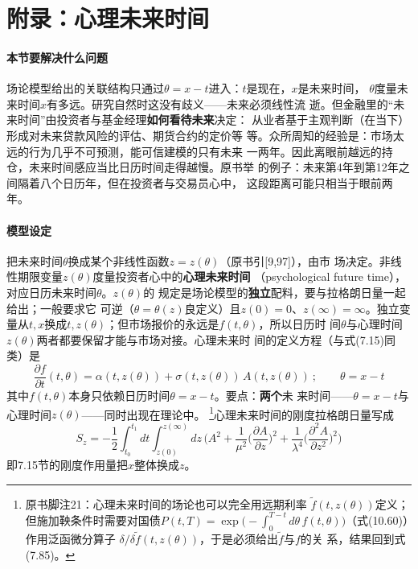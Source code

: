 \section{附录：心理未来时间}

\paragraph{本节要解决什么问题}
场论模型给出的关联结构只通过$\theta=x-t$进入：$t$是现在，$x$是未来时间，
$\theta$度量未来时间$x$有多远。研究自然时这没有歧义——未来必须线性流
逝。但金融里的“未来时间”由投资者与基金经理\textbf{如何看待未来}决定：
从业者基于主观判断（在当下）形成对未来贷款风险的评估、期货合约的定价等
等。众所周知的经验是：市场太远的行为几乎不可预测，能可信建模的只有未来
一两年。因此离眼前越远的持仓，未来时间感应当比日历时间走得越慢。原书举
的例子：未来第4年到第12年之间隔着八个日历年，但在投资者与交易员心中，
这段距离可能只相当于眼前两年。

\paragraph{模型设定}
把未来时间$\theta$换成某个非线性函数$z=z(\theta)$（原书引[9,97]），由市
场决定。非线性期限变量$z(\theta)$度量投资者心中的\textbf{心理未来时间}
（psychological future time），对应日历未来时间$\theta$。$z(\theta)$的
规定是场论模型的\textbf{独立}配料，要与拉格朗日量一起给出；一般要求它
可逆（$\theta=\theta(z)$良定义）且$z(0)=0$、$z(\infty)=\infty$。独立变
量从$t,x$换成$t,z(\theta)$；但市场报价的永远是$f(t,\theta)$，所以日历时
间$\theta$与心理时间$z(\theta)$两者都要保留才能与市场对接。心理未来时
间的定义方程（与式(7.15)同类）是
\begin{equation*}
\frac{\partial f}{\partial t}(t,\theta)=\alpha(t,z(\theta))
+\sigma(t,z(\theta))\,A(t,z(\theta))\ ;\qquad \theta=x-t
\tag{7.85}
\end{equation*}
其中$f(t,\theta)$本身只依赖日历时间$\theta=x-t$。要点：\textbf{两个}未
来时间——$\theta=x-t$与心理时间$z(\theta)$——同时出现在理论中。
\footnote{原书脚注21：心理未来时间的场论也可以完全用远期利率
$\tilde{f}(t,z(\theta))$定义；但施加鞅条件时需要对国债$P(t,T)=
\exp\bigl(-\int_{0}^{T-t}d\theta\,f(t,\theta)\bigr)$（式(10.60)）作用泛函微分算子
$\delta/\delta\tilde{f}(t,z(\theta))$，于是必须给出$\tilde{f}$与$f$的关
系，结果回到式(7.85)。}心理未来时间的刚度拉格朗日量写成
\begin{equation*}
S_{z}=-\frac{1}{2}\int_{t_{0}}^{t_{1}}dt\int_{z(0)}^{z(\infty)}dz\,
\Biggl(A^{2}+\frac{1}{\mu^{2}}\biggl(\frac{\partial A}{\partial z}
\biggr)^{2}+\frac{1}{\lambda^{4}}\biggl(\frac{\partial^{2}A}{\partial z^{2}}
\biggr)^{2}\Biggr)
\tag{7.86}
\end{equation*}
即7.15节的刚度作用量把$x$整体换成$z$。

